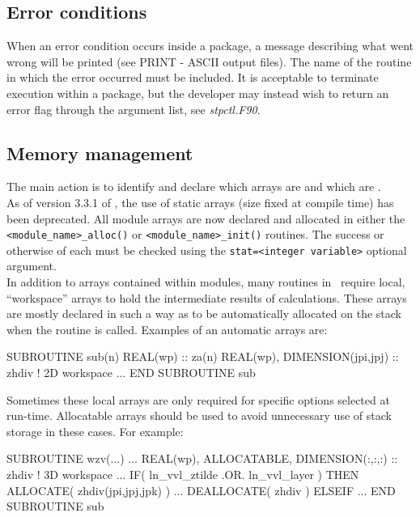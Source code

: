 \subsection{Error conditions}

When an error condition occurs inside a package, a message describing what went wrong will be printed
(see PRINT - ASCII output files).
The name of the routine in which the error occurred must be included.
It is acceptable to terminate execution within a package, but
the developer may instead wish to return an error flag through the argument list,
see \textit{stpctl.F90}.

\subsection{Memory management}

The main action is to identify and declare which arrays are  and which are
. \\ As of version 3.3.1 of \NEMO, the use of static arrays (size fixed
at compile time) has been deprecated.  All module arrays are now declared
 and allocated in either the \texttt{<module\_name>\_alloc()} or
\texttt{<module\_name>\_init()} routines.  The success or otherwise of each
 must be checked using the \texttt{stat=<integer\ variable>} optional
argument. \\

In addition to arrays contained within modules, many routines in \NEMO\ require local,
``workspace'' arrays to hold the intermediate results of calculations.  These arrays are
mostly declared in such a way as to be automatically allocated on the stack when the
routine is called.  Examples of an automatic arrays are:

\begin{forlines}
SUBROUTINE sub(n)
   REAL(wp) :: za(n)
   REAL(wp), DIMENSION(jpi,jpj) ::   zhdiv   ! 2D workspace
   ...
END SUBROUTINE sub
\end{forlines}

Sometimes these local arrays are only required for specific options selected at run-time.
Allocatable arrays should be used to avoid unnecessary use of stack storage in these
cases. For example:

\begin{forlines}
SUBROUTINE wzv(...)
   ...
   REAL(wp), ALLOCATABLE, DIMENSION(:,:,:) ::   zhdiv   ! 3D workspace
   ...
   IF( ln_vvl_ztilde .OR. ln_vvl_layer ) THEN
      ALLOCATE( zhdiv(jpi,jpj,jpk) )
      ...
      DEALLOCATE( zhdiv )
   ELSEIF
      ...
END SUBROUTINE sub
\end{forlines}

